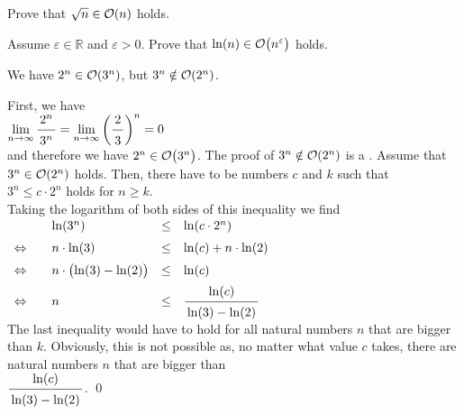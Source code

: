 \exercise
Prove that $\sqrt{n} \in \mathcal{O}(n)$ holds.  \eox

\exercise
Assume $\varepsilon \in \mathbb{R}$ and $\varepsilon > 0$.  Prove that $\ln(n) \in
\mathcal{O}\bigl(n^{\varepsilon}\bigr)$ holds. \eox

\example
We have $2^n \in \mathcal{O}(3^n)$, but  $3^n \notin \mathcal{O}(2^n)$.
\eox

\proof
 First, we have \\[0.2cm]
\hspace*{1.3cm} 
$\displaystyle\lim\limits_{n \rightarrow \infty} \bruch{2^n}{3^n} = 
 \lim\limits_{n \rightarrow \infty} \left(\bruch{2}{3}\right)^n = 0$
\\[0.2cm]
and therefore we have $2^n \in \mathcal{O}\bigl(3^n\bigr)$.  The proof of $3^n \notin \mathcal{O}(2^n)$ is a 
.  Assume that 
$3^n \in \mathcal{O}(2^n)$ holds.  Then, there have to be numbers $c$ and $k$ such that 
\\[0.2cm]
\hspace*{1.3cm}
$3^n \leq c \cdot 2^n$ \quad holds for $n \geq k$. 
\\[0.2cm]
Taking the logarithm of both sides of this inequality we find 
\\[0.2cm]
\hspace*{1.3cm}
$
\begin{array}{llcl}
                & \ln(3^n) & \leq & \ln(c \cdot 2^n) \\[0.2cm]
\Leftrightarrow\quad &  n \cdot \ln(3) & \leq & \ln(c) + n \cdot \ln(2) \\[0.2cm]
\Leftrightarrow &  n \cdot \bigl(\ln(3) - \ln(2)\bigr) & \leq & \ln(c)  \\[0.2cm]
\Leftrightarrow &  n  & \leq & \bruch{\ln(c)}{\ln(3) - \ln(2)}          \\[0.2cm]
\end{array}
$
\\[0.2cm]
The last inequality would have to hold for all natural numbers $n$ that are bigger than $k$.  Obviously,
this is not possible as, no matter what value $c$ takes, there are natural numbers $n$ that are bigger than 
\\[0.2cm]
\hspace*{1.3cm}
$\bruch{\ln(c)}{\ln(3) - \ln(2)}$.
\qed

